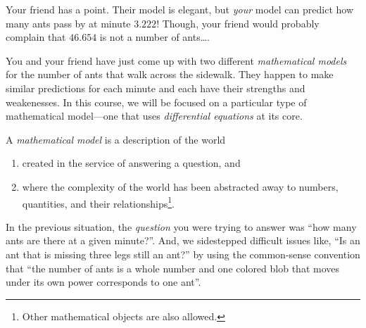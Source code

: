Your friend has a point. Their model is elegant, but \emph{your} model can predict how many ants pass by at minute $3.222$!
Though, your friend would probably complain that $46.654$ is not a number of ants\ldots.

\medskip

You and your friend have just come up with two different \emph{mathematical models} for the number of ants
that walk across the sidewalk. They happen to make similar predictions for each minute and each have their
strengths and weakenesses. In this course, we will be focused on a particular type of mathematical model---one
that uses \emph{differential equations} at its core.


\begin{definition}
A \emph{mathematical model} is a description of the world
	\begin{enumerate}
		\item created in the service of answering a question, and
		\item where the complexity of the world has been abstracted away to numbers, quantities, and their relationships\footnote{Other
mathematical objects are also allowed.}.
	\end{enumerate}
\end{definition}

In the previous situation, the \emph{question} you were trying to answer was ``how many ants are there at a given minute?''.
And, we sidestepped difficult issues like, ``Is an ant that is missing three legs still an ant?'' by using the common-sense
convention that ``the number of ants is a whole number and one colored blob that moves under its own power corresponds to one ant''.





